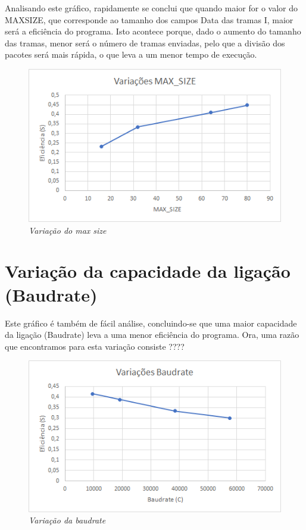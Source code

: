 \documentclass[article, a4paper, 11pt, oneside]{memoir}
\begin{document}
Analisando este gráfico, rapidamente se conclui que quando maior for o valor do MAX\textunderscore SIZE, que corresponde ao tamanho dos campos Data das tramas I,
maior será a eficiência do programa. Isto acontece porque, dado o aumento do tamanho das tramas, menor será o número de tramas enviadas, pelo que a
divisão dos pacotes será mais rápida, o que leva a um menor tempo de execução.

\begin{figure}[h]
	\centering
\includegraphics[scale=0.4]{maxsize.png}
\caption{\emph{Variação do max size}}
\end{figure}

\section{Variação da capacidade da ligação (Baudrate)}

Este gráfico é também de fácil análise, concluindo-se que uma maior capacidade da ligação (Baudrate) leva a uma menor eficiência do programa.
Ora, uma razão que encontramos para esta variação consiste ????

\begin{figure}[h]
	\centering
\includegraphics[scale=0.4]{baudrate.png}
\caption{\emph{Variação da baudrate}}
\end{figure}
\end{document}
